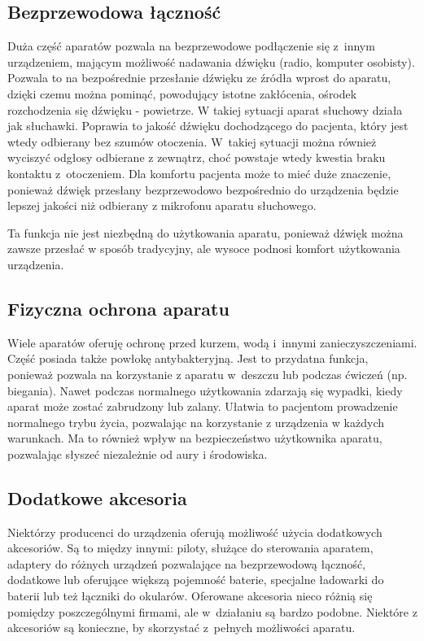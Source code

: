 \documentclass[journal,11pt]{IEEEtran}
\begin{document}
\subsection{Bezprzewodowa łączność}

Duża część aparatów pozwala na bezprzewodowe podłączenie się z~innym urządzeniem, mającym
możliwość nadawania dźwięku (radio, komputer osobisty). Pozwala to na
bezpośrednie przesłanie dźwięku ze źródła wprost do aparatu, dzięki czemu można
pominąć, powodujący istotne zakłócenia, ośrodek rozchodzenia się dźwięku -
powietrze. W takiej sytuacji aparat słuchowy działa jak słuchawki. Poprawia to
jakość dźwięku dochodzącego do pacjenta, który jest wtedy odbierany bez szumów
otoczenia. W~takiej sytuacji można również wyciszyć odgłosy odbierane z
zewnątrz, choć powstaje wtedy kwestia braku kontaktu z~otoczeniem. Dla komfortu
pacjenta może to mieć duże znaczenie, ponieważ dźwięk przesłany bezprzewodowo
bezpośrednio do urządzenia będzie lepszej jakości niż odbierany z mikrofonu
aparatu słuchowego.

Ta funkcja nie jest niezbędną do użytkowania aparatu, ponieważ dźwięk można
zawsze przesłać w sposób tradycyjny, ale wysoce podnosi komfort użytkowania
urządzenia.

\subsection{Fizyczna ochrona aparatu}

Wiele aparatów oferuję ochronę przed kurzem, wodą i~innymi zanieczyszczeniami.
Część posiada także powłokę antybakteryjną. Jest to przydatna funkcja, ponieważ
pozwala na korzystanie z aparatu w~deszczu lub podczas ćwiczeń (np. biegania).
Nawet podczas normalnego użytkowania zdarzają się wypadki, kiedy aparat może
zostać zabrudzony lub zalany. Ułatwia to pacjentom prowadzenie normalnego trybu
życia, pozwalając na korzystanie z urządzenia w każdych warunkach. Ma to
również wpływ na bezpieczeństwo użytkownika aparatu, pozwalając słyszeć
niezależnie od aury i środowiska.

\subsection{Dodatkowe akcesoria}

Niektórzy producenci do urządzenia oferują możliwość użycia dodatkowych
akcesoriów. Są to między innymi: piloty, służące do sterowania aparatem,
adaptery do różnych urządzeń pozwalające na bezprzewodową łączność, dodatkowe
lub oferujące większą pojemność baterie, specjalne ładowarki do baterii lub też
łączniki do okularów. Oferowane akcesoria nieco różnią się pomiędzy
poszczególnymi firmami, ale w~działaniu są bardzo podobne. Niektóre z
akcesoriów są konieczne, by skorzystać z~pełnych możliwości aparatu.
\end{document}
